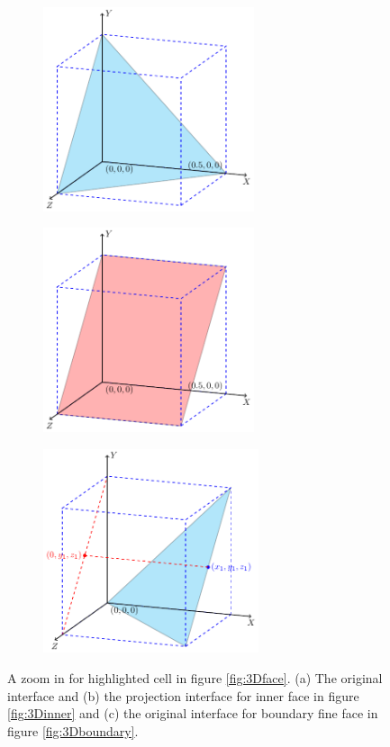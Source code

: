 \documentclass[a4paper]{article}
\begin{document}
\begin{figure}[!htbp]
    \centering
    \begin{subfigure}[b]{0.45\textwidth}
        \centering
        \includegraphics[height=6cm]{image/fs_3D1.pdf}
        \subcaption{}
        \label{fig:3Dinner1}
    \end{subfigure}
    \begin{subfigure}[b]{0.45\textwidth}
        \centering
        \includegraphics[height=6cm]{image/fs_3D2.pdf}
        \subcaption{}
        \label{fig:3Dinner2}
    \end{subfigure}

    \begin{subfigure}[b]{0.45\textwidth}
        \centering
        \includegraphics[height=6cm]{image/fs_3D5.pdf}
        \subcaption{}
        \label{fig:3Dinner3}
    \end{subfigure}
    \caption{A zoom in for highlighted cell in figure \ref{fig:3Dface}. (a) The original interface and (b) the projection interface for inner face in figure \ref{fig:3Dinner} and (c) the original interface for boundary fine face in figure \ref{fig:3Dboundary}.}
\end{figure}
\end{document}
